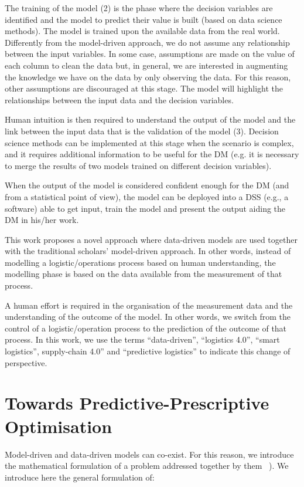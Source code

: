 The training of the model (2) is the phase where the decision variables are identified and the model to predict their value is built (based on data science methods). The model is trained upon the available data from the real world. Differently from the model-driven approach, we do not assume any relationship between the input variables. In some case, assumptions are made on the value of each column to clean the data but, in general, we are interested in augmenting the knowledge we have on the data by only observing the data. For this reason, other assumptions are discouraged at this stage. The model will highlight the relationships between the input data and the decision variables.\par

Human intuition is then required to understand the output of the model and the link between the input data that is the validation of the model (3). Decision science methods can be implemented at this stage when the scenario is complex, and it requires additional information to be useful for the DM (e.g. it is necessary to merge the results of two models trained on different decision variables).\par

When the output of the model is considered confident enough for the DM (and from a statistical point of view), the model can be deployed into a DSS (e.g., a software) able to get input, train the model and present the output aiding the DM in his/her work.\par

This work proposes a novel approach where data-driven models are used together with the traditional scholars’ model-driven approach. In other words, instead of modelling a logistic/operations process based on human understanding, the modelling phase is based on the data available from the measurement of that process.\par

A human effort is required in the organisation of the measurement data and the understanding of the outcome of the model. In other words, we switch from the control of a logistic/operation process to the prediction of the outcome of that process. In this work, we use the terms “data-driven”, “logistics 4.0”, “smart logistics”, supply-chain 4.0” and “predictive logistics” to indicate this change of perspective.

\section{Towards Predictive-Prescriptive Optimisation}
Model-driven and data-driven models can co-exist. For this reason, we introduce the mathematical formulation of a problem addressed together by them ~\cite{Bertsimas2014}). We introduce here the general formulation of:


